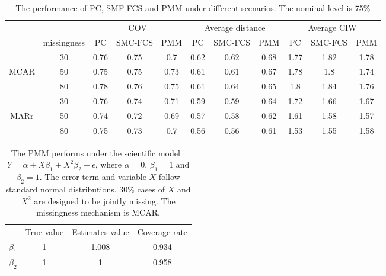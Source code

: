 \documentclass[12pt, fullpage, a4paper]{article}
\begin{document}
\begin{table}
	\begin{tabular}{cc|ccc|ccc|ccc}
		\multicolumn{2}{l}{}                    & \multicolumn{3}{c|}{COV} & \multicolumn{3}{c|}{Average distance} & \multicolumn{3}{c}{Average CIW} \\ \cline{2-11} 
		\multicolumn{1}{c|}{}     & missingness & PC    & SMC-FCS  & PMM   & PC         & SMC-FCS      & PMM       & PC       & SMC-FCS    & PMM     \\
		\multicolumn{1}{c|}{}     & 30          & 0.76  & 0.75     & 0.7   & 0.62       & 0.62         & 0.68      & 1.77     & 1.82       & 1.78    \\
		\multicolumn{1}{c|}{MCAR} & 50          & 0.75  & 0.75     & 0.73  & 0.61       & 0.61         & 0.67      & 1.78     & 1.8        & 1.74    \\
		\multicolumn{1}{c|}{}     & 80          & 0.78  & 0.76     & 0.75  & 0.61       & 0.64         & 0.65      & 1.8      & 1.84       & 1.76    \\ \hline
		\multicolumn{1}{c|}{}     & 30          & 0.76  & 0.74     & 0.71  & 0.59       & 0.59         & 0.64      & 1.72     & 1.66       & 1.67    \\
		\multicolumn{1}{c|}{MARr} & 50          & 0.74  & 0.72     & 0.69  & 0.57       & 0.58         & 0.62      & 1.61     & 1.58       & 1.57    \\
		\multicolumn{1}{c|}{}     & 80          & 0.75  & 0.73     & 0.7   & 0.56       & 0.56         & 0.61      & 1.53     & 1.55       & 1.58   
	\end{tabular}
	\caption{The performance of PC, SMF-FCS and PMM under different scenarios. The nominal level is 75\%}
	\label{tab3}
\end{table}

\begin{table}[ht!]
	\begin{tabular}{cccc}
		& True value & Estimates value & Coverage rate \\
		$\beta_1$ & 1          & 1.008           & 0.934         \\
		$\beta_2$ & 1          & 1               & 0.958        
	\end{tabular}
	\caption{The PMM performs under the scientific model : $Y = \alpha + X\beta_{1} + X^2\beta_{2} +\epsilon$, where $\alpha = 0$, $\beta_{1} = 1$ and $\beta_{2} = 1$. The error term and variable $X$ follow standard normal distributions. 30\% cases of $X$ and $X^2$ are designed to be jointly missing. The missingness mechanism is MCAR.}
	\label{tab4}
\end{table}
\end{document}

